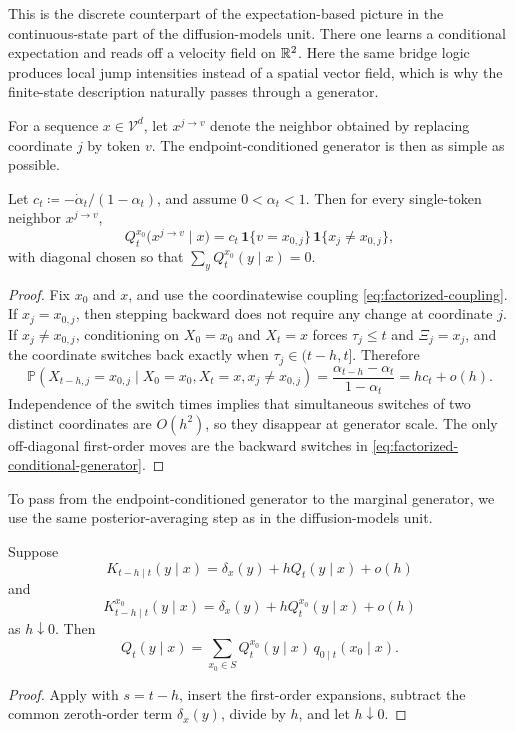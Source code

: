 \documentclass[11pt]{article}
\begin{document}
This is the discrete counterpart of the expectation-based picture in the continuous-state part of the diffusion-models unit.
There one learns a conditional expectation and reads off a velocity field on \(\mathbb{R}^2\).
Here the same bridge logic produces local jump intensities instead of a spatial vector field, which is why the finite-state description naturally passes through a generator.

For a sequence \(x\in\mathcal{V}^d\), let \(x^{j\to v}\) denote the neighbor obtained by replacing coordinate \(j\) by token \(v\).
The endpoint-conditioned generator is then as simple as possible.

\begin{proposition}
\label{prop:factorized-conditional-generator}
Let \(c_t\coloneqq -\dot\alpha_t/(1-\alpha_t)\), and assume \(0<\alpha_t<1\).
Then for every single-token neighbor \(x^{j\to v}\),
\begin{equation}
  Q_t^{x_0}\!\bigl(x^{j\to v}\mid x\bigr)
  =
  c_t\,\mathbf{1}\{v=x_{0,j}\}\,\mathbf{1}\{x_j\neq x_{0,j}\},
  \label{eq:factorized-conditional-generator}
\end{equation}
with diagonal chosen so that \(\sum_y Q_t^{x_0}(y\mid x)=0\).
\end{proposition}
\begin{proof}
Fix \(x_0\) and \(x\), and use the coordinatewise coupling \eqref{eq:factorized-coupling}.
If \(x_j=x_{0,j}\), then stepping backward does not require any change at coordinate \(j\).
If \(x_j\neq x_{0,j}\), conditioning on \(X_0=x_0\) and \(X_t=x\) forces \(\tau_j\le t\) and \(\Xi_j=x_j\), and the coordinate switches back exactly when \(\tau_j\in(t-h,t]\).
Therefore
\[
  \mathbb{P}(X_{t-h,j}=x_{0,j}\mid X_0=x_0,X_t=x, x_j\neq x_{0,j})
  =
  \frac{\alpha_{t-h}-\alpha_t}{1-\alpha_t}
  =
  hc_t+o(h).
\]
Independence of the switch times implies that simultaneous switches of two distinct coordinates are \(O(h^2)\), so they disappear at generator scale.
The only off-diagonal first-order moves are the backward switches in \eqref{eq:factorized-conditional-generator}.%
\end{proof}

To pass from the endpoint-conditioned generator to the marginal generator, we use the same posterior-averaging step as in the diffusion-models unit.

\begin{proposition}
\label{prop:generator-marginalization}
Suppose
\[
  K_{t-h\mid t}(y\mid x)
  =
  \delta_x(y)+hQ_t(y\mid x)+o(h)
\]
and
\[
  K^{x_0}_{t-h\mid t}(y\mid x)
  =
  \delta_x(y)+hQ_t^{x_0}(y\mid x)+o(h)
\]
as \(h\downarrow 0\).
Then
\[
  Q_t(y\mid x)
  =
  \sum_{x_0\in S} Q_t^{x_0}(y\mid x)\,q_{0\mid t}(x_0\mid x).
\]
\end{proposition}
\begin{proof}
Apply  with \(s=t-h\), insert the first-order expansions, subtract the common zeroth-order term \(\delta_x(y)\), divide by \(h\), and let \(h\downarrow 0\).%
\end{proof}
\end{document}
